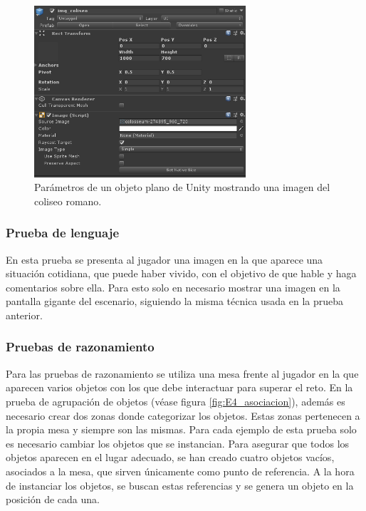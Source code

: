 \begin{figure}
  \centering
    \includegraphics[width=0.7\textwidth]{04.Desarrollo/04.Entrega4/02.Iteracion4_2/00.Figuras/05.imagen.png}
    \caption{Parámetros de un objeto plano de Unity mostrando una imagen del coliseo romano.}
    \label{fig:E4_imagen}
\end{figure}


\subsubsection{Prueba de lenguaje}

En esta prueba se presenta al jugador una imagen en la que aparece una situación cotidiana, que puede haber vivido, con el objetivo de que hable y haga comentarios sobre ella. Para esto solo en necesario mostrar una imagen en la pantalla gigante del escenario, siguiendo la misma técnica usada en la prueba anterior.

\subsubsection{Pruebas de razonamiento}


Para las pruebas de razonamiento se utiliza una mesa frente al jugador en la que aparecen varios objetos con los que debe interactuar para superar el reto. En la prueba de agrupación de objetos (véase figura \ref{fig:E4_asociacion}), además es necesario crear dos zonas donde categorizar los objetos. Estas zonas pertenecen a la propia mesa y siempre son las mismas. Para cada ejemplo de esta prueba solo es necesario cambiar los objetos que se instancian. Para asegurar que todos los objetos aparecen en el lugar adecuado, se han creado cuatro objetos vacíos, asociados a la mesa, que sirven únicamente como punto de referencia. A la hora de instanciar los objetos, se buscan estas referencias y se genera un objeto en la posición de cada una. 

